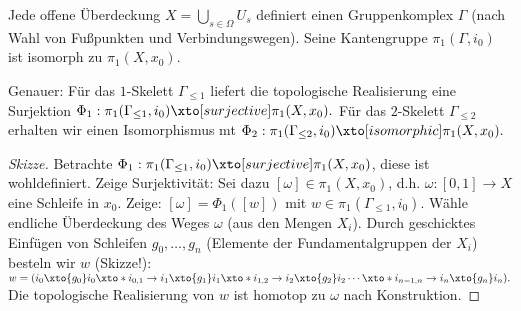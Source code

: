 \begin{st}
    Jede offene Überdeckung $X = \bigcup_{s \in \Omega} U_s$ definiert einen Gruppenkomplex $\Gamma$ (nach Wahl von Fußpunkten und Verbindungswegen).
    Seine Kantengruppe $\pi_1(\Gamma, i_0)$ ist isomorph zu $\pi_1(X, x_0)$.

    Genauer: Für das $1$-Skelett $\Gamma_{\le 1}$ liefert die topologische Realisierung eine Surjektion
    \begin{math}
        \Phi_1: \pi_1(\Gamma_{\le 1}, i_0) \xto[surjective] \pi_1(X, x_0).
    \end{math}
    Für das $2$-Skelett $\Gamma_{\le 2}$ erhalten wir einen Isomorphismus
    mt
    \begin{math}
        \Phi_2 : \pi_1(\Gamma_{\le 2}, i_0) \xto[isomorphic] \pi_1(X, x_0).
    \end{math}
    \begin{proof}[Skizze]
        Betrachte $\Phi_1: \pi_1(\Gamma_{\le 1}, i_0) \xto[surjective] \pi_1(X, x_0)$, diese ist wohldefiniert.
        Zeige Surjektivität:
        Sei dazu $[\omega] \in \pi_1(X, x_0)$, d.h. $\omega:[0,1] \to X$ eine Schleife in $x_0$.
        Zeige: $[\omega] = \Phi_1([w])$ mit $w \in \pi_1(\Gamma_{\le 1}, i_0)$.
        Wähle endliche Überdeckung des Weges $\omega$ (aus den Mengen $X_i$).
        Durch geschicktes Einfügen von Schleifen $g_0, \dotsc, g_n$ (Elemente der Fundamentalgruppen der $X_i$) besteln wir $w$ (Skizze!):
        \begin{math}
            w = (i_0 \xto{g_0} i_0 \xto* i_{0,1} \to i_1 \xto{g_1} i_1 \xto* i_{1,2} \to i_2 \xto{g_2} i_2 \dotsb \xto* i_{n-1,n} \to i_n \xto{g_n} i_n).
        \end{math}
        Die topologische Realisierung von $w$ ist homotop zu $\omega$ nach Konstruktion.


\end{proof}
\end{st}
